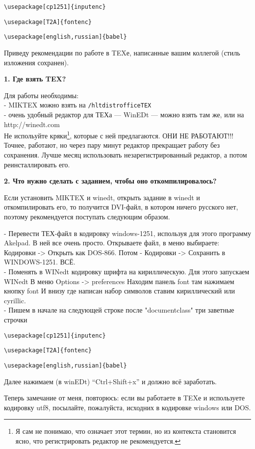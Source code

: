 \documentclass[10pt,twocolumn]{article}
\begin{document}
{\verb|\usepackage[cp1251]{inputenc}|

\verb|\usepackage[T2A]{fontenc}|

\verb|\usepackage[english,russian]{babel}|

Приведу рекомендации по работе в TEXе, написанные вашим коллегой
(стиль изложения сохранен).

{\bf 1. Где взять TEX?}  

Для работы необходимы: \\
- MIKTEX можно взять на \verb|/hltdistrofficeTEX| \\
- очень удобный редактор для ТЕХа --- WinEDt --- можно взять там же, или на http://winedt.com \\
Не испольуйте кряки\footnote{Я сам не понимаю, что означает этот термин,
но из контекста становится ясно, что регистрировать редактор не рекомендуется.}, которые с ней предлагаются. 
ОНИ НЕ РАБОТАЮТ!!! Точнее, работают, но через пару минут редактор прекращает работу без сохранения. 
Лучше месяц использовать  незарегистрированный редактор, а потом реинсталлировать его.

{\bf 2. Что нужно сделать с заданием, чтобы оно откомпилировалось? }

Если установить MIKTEX и winedt, открыть задание в winedt и откомпилировать его, то  получится DVI-файл, в котором ничего русского нет,
поэтому рекомендуется поступать следующим образом.


- Перевести ТЕХ-файл в кодировку windows-1251,
используя для этого программу Akelpad. В ней все очень просто. Открываете файл, в меню выбираете: 
Кодировки -> Открыть как DOS-866. Потом - Кодировки -> Сохранить в WINDOWS-1251. ВСЁ. \\
- Поменять в WINedt кодировку шрифта на кириллическую. 
Для этого запускаем WINedt В меню Options -> preferences 
Находим панель font там нажимаем кнопку font И внизу где написан набор символов 
ставим кириллический или cyrillic.\\
- Пишем в начале на следующей строке после "documentclass" три заветные строчки 

\verb|\usepackage[cp1251]{inputenc}|

\verb|\usepackage[T2A]{fontenc}|

\verb|\usepackage[english,russian]{babel}|

Далее нажимаем (в winEDt) ``Ctrl+Shift+x'' и должно всё заработать. 

Теперь замечание от меня, повторюсь: если вы работаете в TEXе и используете кодировку 
utf8, посылайте, пожалуйста, исходних в кодировке windows или DOS.

}
\end{document}
